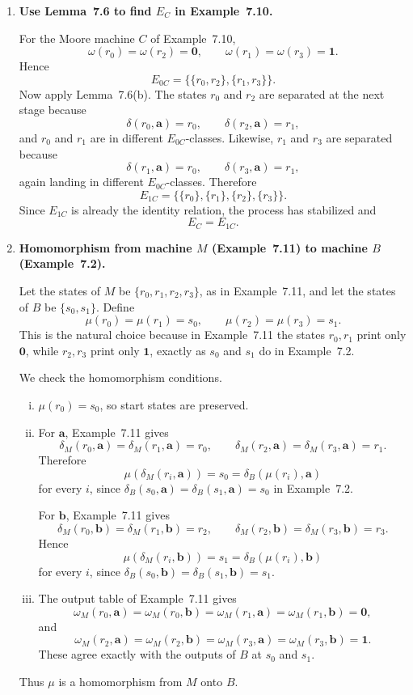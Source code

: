 \begin{enumerate}[{7.}1.]
\item \textbf{Use Lemma~7.6 to find $E_C$ in Example~7.10.}

For the Moore machine $C$ of Example~7.10,
\[
  \omega(r_0)=\omega(r_2)=\pmb{0},\qquad
  \omega(r_1)=\omega(r_3)=\pmb{1}.
\]
Hence
\[
  E_{0C}=\bigl\{\{r_0,r_2\},\{r_1,r_3\}\bigr\}.
\]
Now apply Lemma~7.6(b).  The states $r_0$ and $r_2$ are separated at the next
stage because
\[
  \delta(r_0,\pmb{a})=r_0,\qquad \delta(r_2,\pmb{a})=r_1,
\]
and $r_0$ and $r_1$ are in different $E_{0C}$-classes.  Likewise, $r_1$ and
$r_3$ are separated because
\[
  \delta(r_1,\pmb{a})=r_0,\qquad \delta(r_3,\pmb{a})=r_1,
\]
again landing in different $E_{0C}$-classes.  Therefore
\[
  E_{1C}=\bigl\{\{r_0\},\{r_1\},\{r_2\},\{r_3\}\bigr\}.
\]
Since $E_{1C}$ is already the identity relation, the process has stabilized and
\[
  E_C=E_{1C}.
\]

\item \textbf{Homomorphism from machine $M$ (Example~7.11) to machine $B$ (Example~7.2).}

Let the states of $M$ be $\{r_0,r_1,r_2,r_3\}$, as in Example~7.11, and let
the states of $B$ be $\{s_0,s_1\}$.  Define
\[
  \mu(r_0)=\mu(r_1)=s_0,\qquad \mu(r_2)=\mu(r_3)=s_1.
\]
This is the natural choice because in Example~7.11 the states $r_0,r_1$ print
only $\pmb{0}$, while $r_2,r_3$ print only $\pmb{1}$, exactly as $s_0$ and
$s_1$ do in Example~7.2.

We check the homomorphism conditions.
\begin{enumerate}[(i)]
  \item $\mu(r_0)=s_0$, so start states are preserved.
  \item For $\pmb{a}$, Example~7.11 gives
  \[
    \delta_M(r_0,\pmb{a})=\delta_M(r_1,\pmb{a})=r_0,\qquad
    \delta_M(r_2,\pmb{a})=\delta_M(r_3,\pmb{a})=r_1.
  \]
  Therefore
  \[
    \mu(\delta_M(r_i,\pmb{a}))=s_0=\delta_B(\mu(r_i),\pmb{a})
  \]
  for every $i$, since $\delta_B(s_0,\pmb{a})=\delta_B(s_1,\pmb{a})=s_0$ in
  Example~7.2.

  For $\pmb{b}$, Example~7.11 gives
  \[
    \delta_M(r_0,\pmb{b})=\delta_M(r_1,\pmb{b})=r_2,\qquad
    \delta_M(r_2,\pmb{b})=\delta_M(r_3,\pmb{b})=r_3.
  \]
  Hence
  \[
    \mu(\delta_M(r_i,\pmb{b}))=s_1=\delta_B(\mu(r_i),\pmb{b})
  \]
  for every $i$, since $\delta_B(s_0,\pmb{b})=\delta_B(s_1,\pmb{b})=s_1$.
  \item The output table of Example~7.11 gives
  \[
    \omega_M(r_0,\pmb{a})=\omega_M(r_0,\pmb{b})
    =\omega_M(r_1,\pmb{a})=\omega_M(r_1,\pmb{b})=\pmb{0},
  \]
  and
  \[
    \omega_M(r_2,\pmb{a})=\omega_M(r_2,\pmb{b})
    =\omega_M(r_3,\pmb{a})=\omega_M(r_3,\pmb{b})=\pmb{1}.
  \]
  These agree exactly with the outputs of $B$ at $s_0$ and $s_1$.
\end{enumerate}
Thus $\mu$ is a homomorphism from $M$ onto $B$.


\end{enumerate}
